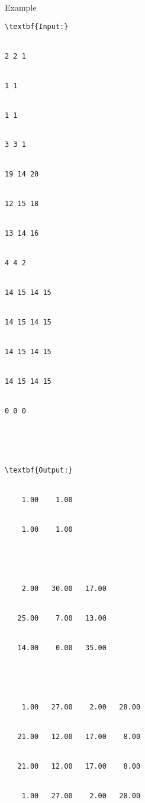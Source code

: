 Example
\begin{verbatim}
\textbf{Input:}


2 2 1


1 1


1 1


3 3 1


19 14 20


12 15 18


13 14 16


4 4 2


14 15 14 15


14 15 14 15


14 15 14 15


14 15 14 15


0 0 0





\textbf{Output:}


    1.00    1.00 


    1.00    1.00





    2.00   30.00   17.00


   25.00    7.00   13.00


   14.00    0.00   35.00





    1.00   27.00    2.00   28.00


   21.00   12.00   17.00    8.00


   21.00   12.00   17.00    8.00


    1.00   27.00    2.00   28.00\end{verbatim}